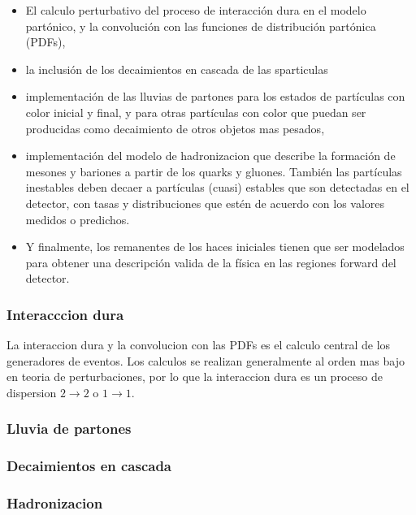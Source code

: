 \begin{itemize}\itemsep0.2cm\parskip0.2cm
\item El calculo perturbativo del proceso de interacción dura en el
  modelo partónico, y la convolución con las funciones de distribución
  partónica (PDFs),
\item la inclusión de los decaimientos en cascada de las sparticulas
\item implementación de las lluvias de partones
  para los estados de partículas con color inicial y final, y para otras
  partículas con color que puedan ser producidas como decaimiento
  de otros objetos mas pesados,
\item implementación del modelo de hadronizacion que describe la
  formación de mesones y bariones a partir de los quarks y gluones.
  También las partículas inestables deben decaer a partículas (cuasi)
  estables que son detectadas en el detector, con tasas y distribuciones
  que estén de acuerdo con los valores medidos o predichos.
\item Y finalmente, los remanentes de los haces iniciales tienen que
  ser modelados para obtener una descripción valida de la física
  en las regiones forward del detector.
\end{itemize}



\subsubsection{Interacccion dura}

La interaccion dura y la convolucion con las PDFs es el calculo central
de los generadores de eventos. Los calculos se realizan generalmente
al orden mas bajo en teoria de perturbaciones, por lo que la interaccion
dura es un proceso de dispersion $2\to 2$ o $1\to 1$.

\subsubsection{Lluvia de partones}


\subsubsection{Decaimientos en cascada}


\subsubsection{Hadronizacion}


